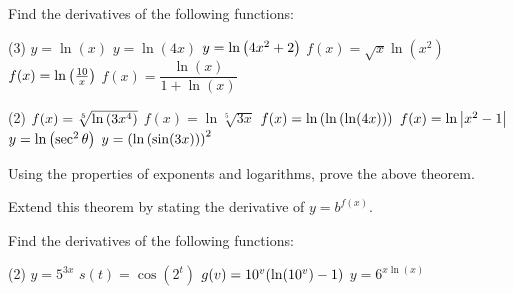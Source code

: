 \documentclass[mathNotesPreamble]{subfiles}
\begin{document}
  \begin{ex*}
    Find the derivatives of the following functions:
  \end{ex*}
  \begin{tasks}[after-item-skip=\stretch{1}, label=~](3)
    \task $y=\ln(x)$
    \task $y=\ln(4x)$
    \task $y=\ln{\left(4x^2+2\right)}$
    \task $f(x)=\sqrt x\ln(x^2)$
    \task $f(x)=\ln{\left(\frac{10}{x}\right)}$
    \task $f(x)=\dfrac{\ln(x)}{1+\ln(x)}$
  \end{tasks}
  \vfill
  
  \pagebreak
  \begin{tasks}[after-item-skip=\stretch{1}, label=~](2)
    \task $f(x)=\sqrt[5]{\ln{\left(3x^4\right)}}$
    \task $f(x)=\ln\sqrt[5]{3x}$
    \task $f(x)=\ln{\left(\ln{\left(\ln(4x)\right)}\right)}$
    \task $f(x)=\ln{\left\vert x^2-1\right\vert}$
    \task $y=\ln{\left(\sec^2\theta\right)}$
    \task $y={\left(\ln{\left(\sin(3x)\right)}\right)}^2$
  \end{tasks}
  \vfill 
  \pagebreak
  
  \noindent
  \begin{ex*}
    Using the properties of exponents and logarithms, prove the above theorem. 
    
    \noindent
    Extend this theorem by stating the derivative of $y=b^{f(x)}$.
  \end{ex*}
  \vfill
  
  \begin{ex*}
    Find the derivatives of the following functions:
  \end{ex*}
  \begin{tasks}[after-item-skip=\stretch{1}, label=~](2)
    \task $y=5^{3x}$
    \task $s(t)=\cos(2^t)$
    \task $g(v)=10^v{\left(\ln(10^v)-1\right)}$
    \task $y=6^{x\ln(x)}$
  \end{tasks}
  \vfill 
  
  \pagebreak
  
  \noindent
\end{document}
